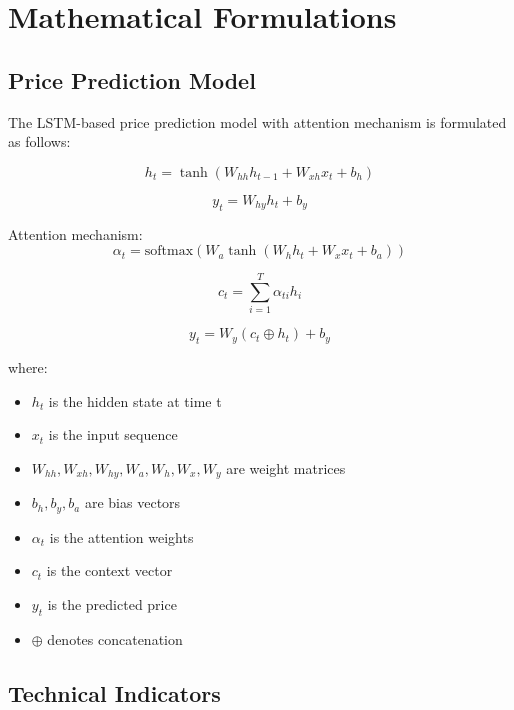 \documentclass[conference]{IEEEtran}
\begin{document}
\section{Mathematical Formulations}

\subsection{Price Prediction Model}
The LSTM-based price prediction model with attention mechanism is formulated as follows:

\begin{equation}
h_t = \tanh(W_{hh}h_{t-1} + W_{xh}x_t + b_h)
\end{equation}

\begin{equation}
y_t = W_{hy}h_t + b_y
\end{equation}

Attention mechanism:
\begin{equation}
\alpha_t = \text{softmax}(W_a \tanh(W_h h_t + W_x x_t + b_a))
\end{equation}

\begin{equation}
c_t = \sum_{i=1}^T \alpha_{ti} h_i
\end{equation}

\begin{equation}
y_t = W_y(c_t \oplus h_t) + b_y
\end{equation}

where:
\begin{itemize}
    \item $h_t$ is the hidden state at time t
    \item $x_t$ is the input sequence
    \item $W_{hh}, W_{xh}, W_{hy}, W_a, W_h, W_x, W_y$ are weight matrices
    \item $b_h, b_y, b_a$ are bias vectors
    \item $\alpha_t$ is the attention weights
    \item $c_t$ is the context vector
    \item $y_t$ is the predicted price
    \item $\oplus$ denotes concatenation
\end{itemize}

\subsection{Technical Indicators}
\end{document}
